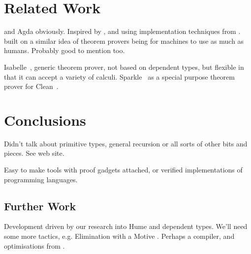 \section{Related Work}

\Coq{} \cite{coq-manual} and Agda \cite{agda} obviously. Inspired by
\cite{mcbride-thesis}, and using implementation techniques from
\cite{not-a-number}. \Epigram{}~\cite{view-left} built on
a similar idea of theorem provers being for machines to use as much as
humans. Probably good to mention \cite{epireloaded} too.

Isabelle~\cite{isabelle}, generic theorem prover, not based on
dependent types, but flexible in that it can accept a variety of
calculi.  Sparkle~\cite{sparkle} as a special purpose theorem prover
for Clean~\cite{clean}.

\section{Conclusions}

Didn't talk about primitive types, general recursion or all sorts of
other bits and pieces. See web site.

Easy to make tools with proof gadgets attached, or verified
implementations of programming languages.

\subsection{Further Work}

Development driven by our research into Hume and dependent types.
We'll need some more tactics, e.g. Elimination with a Motive
\cite{elim-motive}. Perhaps a compiler, and optimisations from
\cite{brady-thesis}.